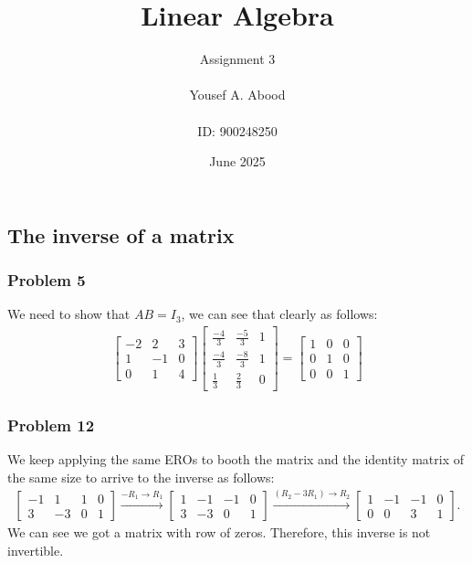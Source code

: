 \documentclass[a4paper,12pt]{article}
\title{Linear Algebra}
\author{Assignment 3\\ \\ Yousef A. Abood\\ \\ ID: 900248250}
\date{June 2025}
\begin{document}
\maketitle
\noindent\makebox[\linewidth]{\rule{15cm}{0.4pt}}
\subsection{The inverse of a matrix}
\subsubsection*{Problem 5} 
We need to show that $AB=I_3$, we can see that clearly as follows:
\begin{align*}
    \begin{bmatrix}
      -2 & 2 & 3 \\
      1 & -1 & 0 \\
      0 & 1 & 4
    \end{bmatrix} \begin{bmatrix}
      \frac{-4}{3} & \frac{-5}{3} & 1 \\
      \frac{-4}{3} & \frac{-8}{3} & 1 \\
      \frac{1}{3} & \frac{2}{3} & 0
    \end{bmatrix} = \begin{bmatrix}
      1 & 0 & 0 \\
      0 & 1 & 0 \\
      0 & 0 & 1
    \end{bmatrix}
\end{align*}
\subsubsection*{Problem 12}
We keep applying the same EROs to booth the matrix and the identity matrix of the same size to arrive to the inverse as follows: 
\begin{align*}
    \left [\begin{array}{cc|cc}
     -1 & 1 & 1 & 0 \\
      3 & -3& 0 & 1   
    \end{array} \right ] \xrightarrow{{-R_1}	\to{R_1}}
    \left [\begin{array}{cc|cc}
     1 & -1 & -1 & 0 \\
      3 & -3& 0 & 1   
    \end{array} \right ] \xrightarrow{{(R_2-3R_1)}\to{R_2}}
    \left [\begin{array}{cc|cc}
     1 & -1 & -1 & 0 \\
      0 & 0& 3 & 1   
    \end{array} \right ].
\end{align*}
We can see we got a matrix with row of zeros. Therefore, this inverse is not invertible.
\end{document}
